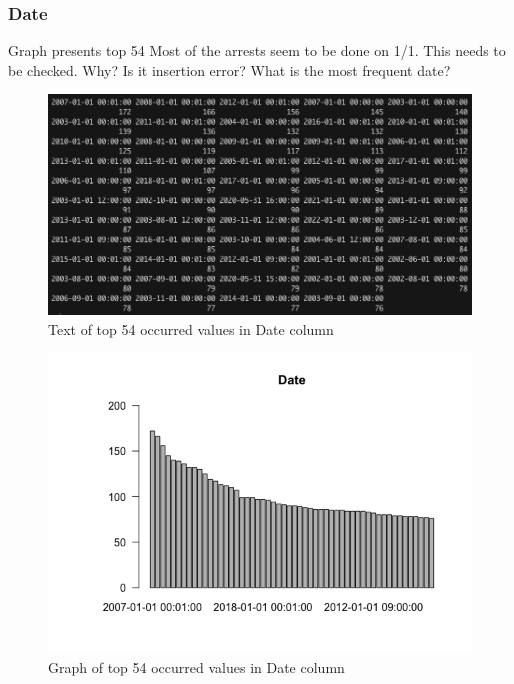 \newpage
\subsubsection{Date}
Graph presents top 54
Most of the arrests seem to be done on 1/1. This needs to be checked. Why? Is it insertion error? What is the most frequent date?
\begin{figure}[H]
\includegraphics[scale=0.45]{images/EDA/Date.jpg}
\centering
\caption{Text of top 54 occurred values in Date column}
\end{figure}
\begin{figure}[H]
\includegraphics[scale=0.7]{images/EDA/Date.png}
\centering
\caption{Graph of top 54 occurred values in Date column}
\end{figure}